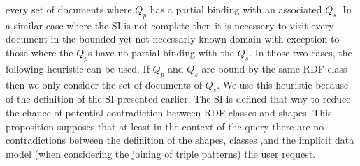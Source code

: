 every set of documents where $Q_p$ has a partial binding with an associated $Q_s$.
In a similar case where the SI is not complete then it is necessary to visit every document in the bounded yet not necessarly known domain 
with exception to those where the $Q_p$s have no partial binding with the $Q_s$.
In those two cases, the following heuristic can be used.
If $Q_p$ and $Q_s$ are bound by the same RDF class then we only consider the set of documents of $Q_s$.
We use this heuristic because of the definition of the SI presented earlier.
The SI is defined that way to reduce the chance of potential contradiction between RDF classes and shapes.
This proposition supposes that at least in the context of the query there are no contradictions between the
definition of the shapes, classes ,and the implicit data model (when considering the joining of triple patterns) the user request.